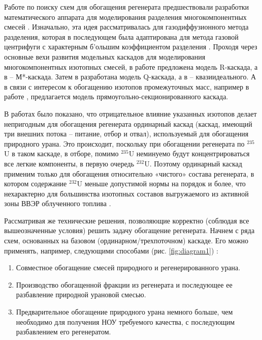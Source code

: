 Работе по поиску схем для обогащения регенерата предшествовали разработки математического аппарата для моделирования разделения многокомпонентных смесей \cite{delagarzaMulticomponentIsotopeSeparation1961}. Изначально, эта идея рассматривалась для газодиффузионного метода разделения, которая в последующем была адаптирована для метода газовой центрифуги с характерным б'ольшим коэффициентом разделения \cite{yamamotoMulticomponentIsotopeSeparating1978}.
Проходя через основные вехи развития модельных каскадов для моделирования многокомпонентных изотопных смесей, в работе \cite{delagarzaMulticomponentIsotopeSeparation1961} предложена модель R-каскада, а в \cite{levin1963} -- М*-каскада. Затем в \cite{minenkoTeoriiKaskadovDlya1965} разработана модель Q-каскада, а в \cite{sazykinKvaziidealnyeKaskadyDlya2000} -- квазиидеального. А в связи с интересом к обогащению изотопов промежуточных масс, например в работе \cite{kolokoltsovDesignCascadesSeparating1970}, предлагается модель прямоугольно-секционированного каскада.


В работах \cite{sulaberidzeNekotoryhRazdelitelnyhProblemah2004,sulaberidzeProblemsRefinementRecycled4, smirnovKaskadnyeShemyZadachah2012} было показано, что отрицательное влияние указанных изотопов делает непригодным для обогащения регенерата ординарный каскад (каскад, имеющий три внешних потока – питание, отбор и отвал), используемый для обогащения природного урана. Это происходит, поскольку при обогащении регенерата по $^{235}$U в таком каскаде, в отборе, помимо $^{235}$U неминуемо будут концентрироваться все легкие компоненты, в первую очередь $^{232}$U. Поэтому ординарный каскад применим только для обогащения относительно «чистого» состава регенерата, в котором содержание $^{232}$U меньше допустимой нормы на порядок и более, что нехарактерно для большинства изотопных составов выгружаемого из активной зоны ВВЭР облученного топлива \cite{bormanTehnikoekonomicheskiyAnalizVozmozhnyh2012}.

Рассматривая же технические решения, позволяющие корректно (соблюдая все вышеозначенные условия) решить задачу обогащение регенерата. Начнем с ряда схем, основанных на базовом (ординарном/трехпоточном) каскаде.
Его можно применять, например, следующими способами (рис. \ref{fig:diagram1}) \cite{smirnovKaskadnyeShemyZadachah2012}:
\begin{enumerate}
  \item Совместное обогащение смесей природного и регенерированного урана.
  \item Производство обогащенной фракции из регенерата и последующее ее разбавление природной урановой смесью.
  \item Предварительное обогащение природного урана немного больше, чем необходимо для получения НОУ требуемого качества, с последующим разбавлением его регенератом.
\end{enumerate}

